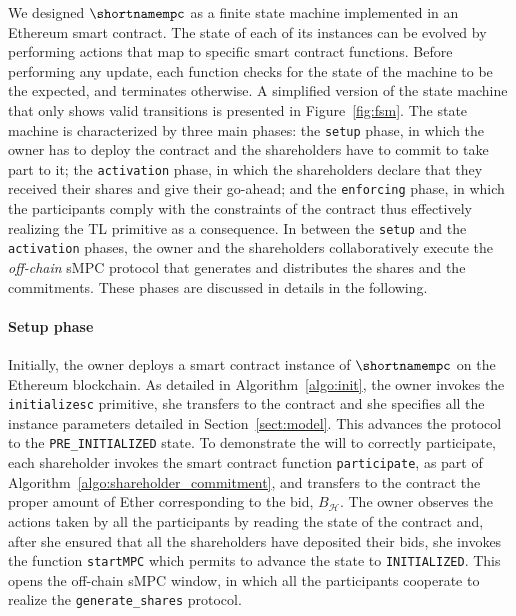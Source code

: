 We designed $\shortnamempc$ as a finite state machine implemented in an Ethereum smart contract.
The state of each of its instances can be evolved by performing actions that map to specific smart contract functions.
Before performing any update, each function checks for the state of the machine to be the expected, and terminates otherwise.
A simplified version of the state machine that only shows valid transitions is presented in Figure~\ref{fig:fsm}.
The state machine is characterized by three main phases: the \texttt{setup} phase, in which the owner has to deploy the contract and the shareholders have to commit to take part to it; the \texttt{activation} phase, in which the shareholders declare that they received their shares and give their go-ahead; and the \texttt{enforcing} phase, in which the participants comply with the constraints of the contract thus effectively realizing the TL primitive as a consequence.
%
%
In between the \texttt{setup} and the \texttt{activation} phases, the owner and the shareholders collaboratively execute the {\em off-chain} sMPC protocol that generates and distributes the shares and the commitments.
These phases are discussed in details in the following.

\medskip

\paragraph*{Setup phase}
Initially, the owner deploys a smart contract instance of $\shortnamempc$ on the Ethereum blockchain.
As detailed in Algorithm~\ref{algo:init}, the owner invokes the \texttt{initialize\textunderscore sc} primitive, she transfers \PO to the contract and she specifies all the instance parameters detailed in Section~\ref{sect:model}.
This advances the protocol to the \texttt{PRE\_INITIALIZED} state. 
To demonstrate the will to correctly participate, each shareholder invokes the smart contract function \texttt{participate}, as part of Algorithm~\ref{algo:shareholder_commitment}, and transfers to the contract the proper amount of Ether corresponding to the bid, $B_{\mathcal{H}}$. 
The owner observes the actions taken by all the participants by reading the state of the contract and, after she ensured that all the shareholders have deposited their bids, she invokes the function \texttt{startMPC} which permits to advance the state to \texttt{INITIALIZED}.
This opens the off-chain sMPC window, in which all the participants cooperate to realize the \texttt{generate\_shares} protocol.


